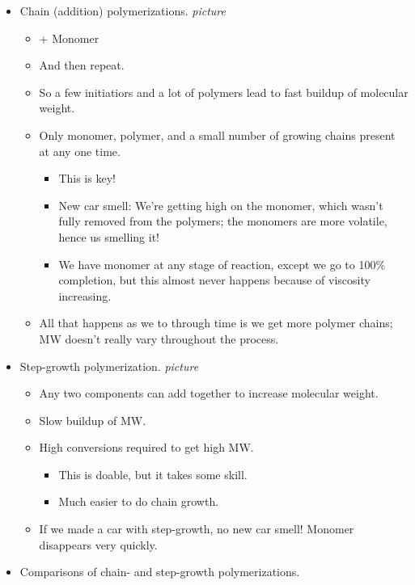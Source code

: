 \documentclass[../notes.tex]{subfiles}
\begin{document}
\begin{itemize}
\begin{itemize}
\begin{itemize}
        \end{itemize}
    \end{itemize}
    \item Chain (addition) polymerizations.
    \emph{picture}
    \begin{itemize}
        \item {} + Monomer \ce{->} 
        \item And then repeat.
        \item So a few initiatiors and a lot of polymers lead to fast buildup of molecular weight.
        \item Only monomer, polymer, and a small number of growing chains present at any one time.
        \begin{itemize}
            \item This is key!
            \item New car smell: We're getting high on the monomer, which wasn't fully removed from the polymers; the monomers are more volatile, hence us smelling it!
            \item We have monomer at any stage of reaction, except we go to 100\% completion, but this almost never happens because of viscosity increasing.
        \end{itemize}
        \item All that happens as we to through time is we get more polymer chains; MW doesn't really vary throughout the process.
    \end{itemize}
    \item Step-growth polymerization.
    \emph{picture}
    \begin{itemize}
        \item Any two components can add together to increase molecular weight.
        \item Slow buildup of MW.
        \item High conversions required to get high MW.
        \begin{itemize}
            \item This is doable, but it takes some skill.
            \item Much easier to do chain growth.
        \end{itemize}
        \item If we made a car with step-growth, no new car smell! Monomer disappears very quickly.
    \end{itemize}
    \item Comparisons of chain- and step-growth polymerizations.

\end{itemize}
\end{document}
